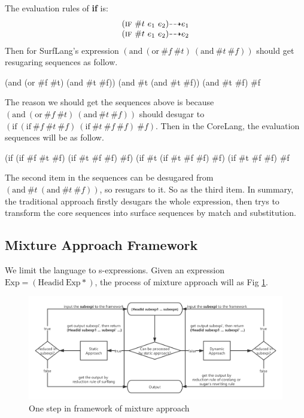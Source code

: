 The evaluation rules of {\bfseries if} is:
\[
\begin{array}{l}
(\m{if}~\true~e_1~e_2) \DeStep{e_1}\\
(\m{if}~\true~e_1~e_2) \DeStep{e_2}
\end{array}
\]
Then for SurfLang's expression $(\mbox{and}~(\mbox{or}~\#f~\#t)~(\mbox{and}~\#t~\#f))$ should get resugaring sequences as follow.

\begin{Codes}
    (and (or \#f \#t) (and \#t \#f))
\OneStep (and \#t (and \#t \#f))
\OneStep (and \#t \#f)
\OneStep \#f
\end{Codes}

The reason we should get the sequences above is because $(\mbox{and}~(\mbox{or}~\#f~\#t)~(\mbox{and}~\#t~\#f))$ should desugar to $(\mbox{if}~(\mbox{if}~\#f~\#t~\#f)~(\mbox{if}~\#t~\#f~\#f)~\#f)$. Then in the CoreLang, the evaluation sequences will be as follow.
\begin{Codes}
    (if (if \#f \#t \#f) (if \#t \#f \#f) \#f)
\OneStep (if \#t (if \#t \#f \#f) \#f)
\OneStep (if \#t \#f \#f)
\OneStep \#f
\end{Codes}

The second item in the sequences can be desugared from $(\mbox{and}~\#t~(\mbox{and}~\#t~\#f))$, so resugars to it. So as the third item. In summary, the traditional approach firstly desugars the whole expression, then trys to transform the core sequences into surface sequences by match and substitution.

\subsection{Mixture Approach Framework}
We limit the language to s-expressions. Given an expression $\mbox{Exp} = (\mbox{Headid}~\mbox{Exp}*)$, the process of mixture approach will as Fig \ref{fig:mixture}.

\begin{figure}[t]
	\centering
	\includegraphics[width=12cm]{images/mixture.png}
	\caption{One step in framework of mixture approach}
	\label{fig:mixture}
\end{figure}

